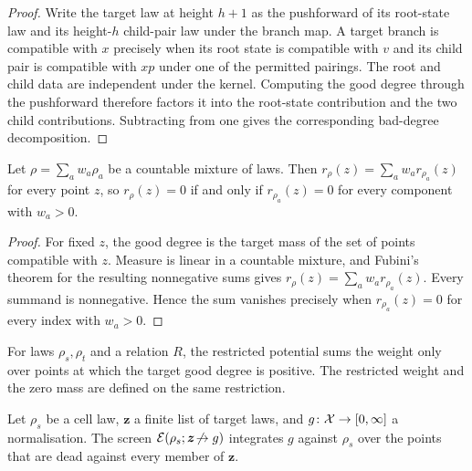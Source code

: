 \begin{proof}
\leanok
Write the target law at height $h+1$ as the pushforward of its root-state law and its
height-$h$ child-pair law under the branch map. A target branch is compatible with $x$ precisely
when its root state is compatible with $v$ and its child pair is compatible with $xp$ under one
of the permitted pairings. The root and child data are independent under the kernel. Computing
the good degree through the pushforward therefore factors it into the root-state contribution and
the two child contributions. Subtracting from one gives the corresponding bad-degree
decomposition.
\end{proof}

\begin{lemma}
\label{thm:fresh-mixture}
\leanok
Let $\rho=\sum_a w_a\rho_a$ be a countable mixture of laws. Then $r_\rho(z)=\sum_a w_ar_{\rho_a}(z)$
for every point $z$, so $r_\rho(z)=0$ if and only if $r_{\rho_a}(z)=0$ for every component with
$w_a>0$.
\end{lemma}

\begin{proof}
\leanok
For fixed $z$, the good degree is the target mass of the set of points compatible with $z$.
Measure is linear in a countable mixture, and Fubini's theorem for the resulting nonnegative sums
gives
$r_\rho(z)=\sum_a w_a r_{\rho_a}(z)$. Every summand is nonnegative. Hence the sum vanishes
precisely when $r_{\rho_a}(z)=0$ for every index with $w_a>0$.
\end{proof}

\begin{definition}
\label{def:restricted}
\leanok
{}
For laws $\rho_s,\rho_t$ and a relation $R$, the restricted potential sums the weight only over
points at which the target good degree is positive. The restricted weight and the zero mass are
defined on the same restriction.
\end{definition}

\begin{definition}
\label{def:screen}
\leanok
{}
Let $\rho_s$ be a cell law, $\boldsymbol z$ a finite list of target laws, and
$g\colon\mathcal{X}\to[0,\infty]$ a normalisation. The screen $\mathcal{E}(\rho_s;\boldsymbol z\!\not\to g)$
integrates $g$ against $\rho_s$ over the points that are dead against every member of
$\boldsymbol z$.
\end{definition}

